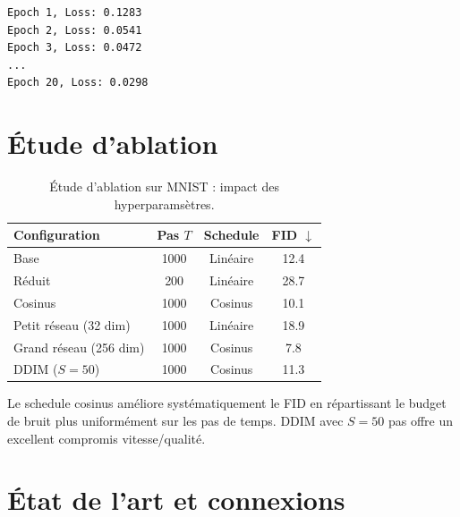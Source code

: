 \begin{codeoutput}
\begin{verbatim}
Epoch 1, Loss: 0.1283
Epoch 2, Loss: 0.0541
Epoch 3, Loss: 0.0472
...
Epoch 20, Loss: 0.0298
\end{verbatim}
\end{codeoutput}

\section{\'Etude d'ablation}
\label{sec:diffusion-ablation}

\begin{table}[htbp]
\centering
\caption{\'Etude d'ablation sur MNIST : impact des hyperparams\`etres.}
\label{tab:diffusion-ablation}
\begin{tabular}{lccc}
\toprule
\textbf{Configuration} & \textbf{Pas $T$} & \textbf{Schedule} & \textbf{FID $\downarrow$} \\
\midrule
Base                    & 1000             & Lin\'eaire       & 12.4 \\
R\'eduit               & 200              & Lin\'eaire       & 28.7 \\
Cosinus                 & 1000             & Cosinus          & 10.1 \\
Petit r\'eseau (32 dim) & 1000            & Lin\'eaire       & 18.9 \\
Grand r\'eseau (256 dim) & 1000           & Cosinus          & 7.8 \\
DDIM ($S=50$)           & 1000             & Cosinus          & 11.3 \\
\bottomrule
\end{tabular}
\end{table}

\begin{remarque}
Le schedule cosinus am\'eliore syst\'ematiquement le FID en r\'epartissant
le budget de bruit plus uniform\'ement sur les pas de temps. DDIM avec $S=50$
pas offre un excellent compromis vitesse/qualit\'e.
\end{remarque}

\section{\'Etat de l'art et connexions}
\label{sec:diffusion-sota}

